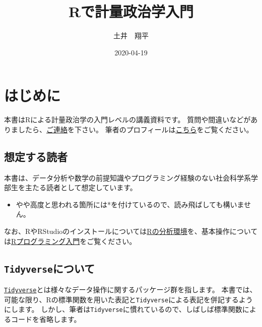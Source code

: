\documentclass[]{bxjsarticle}
\title{Rで計量政治学入門}
\author{土井　翔平}
\date{2020-04-19}
\providecommand{\tightlist}{%
  \setlength{\itemsep}{0pt}\setlength{\parskip}{0pt}}
\begin{document}
\maketitle

{
\setcounter{tocdepth}{2}
\tableofcontents
}
\hypertarget{index}{%
\section*{はじめに}\label{index}}

本書はRによる計量政治学の入門レベルの講義資料です。
質問や間違いなどがありましたら、\href{mailto:shohei.doi0504@gmail.com}{ご連絡}を下さい。
筆者のプロフィールは\href{https://shohei-doi.github.io/}{こちら}をご覧ください。

\hypertarget{ux60f3ux5b9aux3059ux308bux8aadux8005}{%
\subsection*{想定する読者}\label{ux60f3ux5b9aux3059ux308bux8aadux8005}}

本書は、データ分析や数学の前提知識やプログラミング経験のない社会科学系学部生を主たる読者として想定しています。

\begin{itemize}
\tightlist
\item
  やや高度と思われる箇所には*を付けているので、読み飛ばしても構いません。
\end{itemize}

なお、RやRStudioのインストールについては\protect\hyperlink{install-r}{Rの分析環境}を、基本操作については\protect\hyperlink{intro-r}{Rプログラミング入門}をご覧ください。

\hypertarget{tidyverseux306bux3064ux3044ux3066}{%
\subsection*{\texorpdfstring{\texttt{Tidyverse}について}{Tidyverseについて}}\label{tidyverseux306bux3064ux3044ux3066}}

\href{https://www.tidyverse.org/}{\texttt{Tidyverse}}とは様々なデータ操作に関するパッケージ群を指します。
本書では、可能な限り、Rの標準関数を用いた表記と\texttt{Tidyverse}による表記を併記するようにします。
しかし、筆者は\texttt{Tidyverse}に慣れているので、しばしば標準関数によるコードを省略します。
\end{document}

